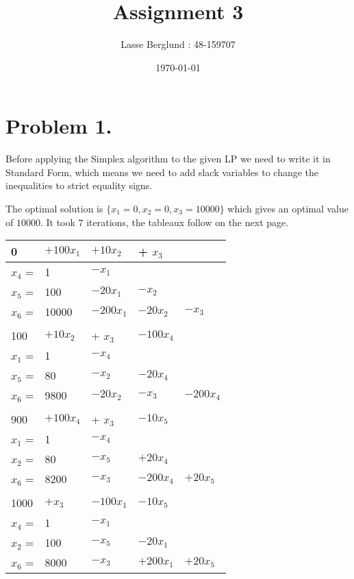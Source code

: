 \documentclass[12pt]{report}
\title{Assignment 3}
\author{Lasse Berglund : 48-159707}
\date{\today}
\begin{document}
\maketitle
\section*{Problem 1.}

Before applying the Simplex algorithm to the given LP we need to write it in Standard Form, which means we need to add slack variables to change the inequalities to strict equality signs.

The optimal solution is $\{ x_1 = 0, x_2 = 0, x_3 = 10000 \}$ which gives an optimal value of $10000$. It took $7$ iterations, the tableaux follow on the next page.


\begin{table}
\begin{center}
\begin{tabular}{ l l l l l }
  0 & $+ 100x_1$ & $+ 10x_2$ & + $x_3$ \\  \hline

  $x_4$ = & 1 & $-x_1$ \\ 
  $x_5$ = & 100 & $-20x_1$ & $- x_2$ \\ 
  $x_6$ = & 10000 & $-200x_1$ & $-20x_2$ & $-x_3$ \\ 

  \\
  100 & $+ 10x_2$ & + $x_3$ & $-100x_4$\\  \hline

  $x_1$ = & 1 &  $-x_4$ \\ 
  $x_5$ = & 80  & $- x_2$ & $-20x_4$ \\ 
  $x_6$ = & 9800  & $-20x_2$ & $-x_3$ & $-200x_4$ \\ 


  \\
  900 & $+ 100x_4$ & + $x_3$ & $-10x_5$\\  \hline

  $x_1$ = & 1 &  $-x_4$ \\ 
  $x_2$ = & 80  & $- x_5$ & $+20x_4$ \\ 
  $x_6$ = & 8200  & $-x_3$ & $-200x_4$ & $+20x_5$ \\ 

  \\
  1000 & $+x_3$ & $-100x_1$ & $-10x_5$ \\  \hline

  $x_4$ = & 1 &  $-x_1$ \\ 
  $x_2$ = & 100 & $- x_5$ & $-20x_1$ \\ 
  $x_6$ = & 8000  & $-x_3$ & $+200x_1$ & $+20x_5$ \\ 
  

\end{tabular}
\end{center}
\end{table}
\end{document}
